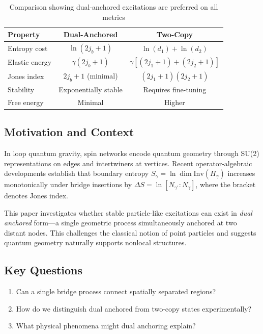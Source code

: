 \documentclass[11pt]{article}
\newcommand{\Inv}{\mathrm{Inv}}
\theoremstyle{plain}
\theoremstyle{definition}
\begin{document}
\begin{table}[h]
  \centering
  \begin{tabular}{lcc}
    \hline
    \textbf{Property} & \textbf{Dual-Anchored} & \textbf{Two-Copy} \\
    \hline
    Entropy cost & $\ln(2j_b+1)$ & $\ln(d_1) + \ln(d_2)$ \\
    Elastic energy & $\gamma (2j_b+1)$ & $\gamma[(2j_1+1) + (2j_2+1)]$ \\
    Jones index & $2j_b+1$ (minimal) & $(2j_1+1)(2j_2+1)$ \\
    Stability & Exponentially stable & Requires fine-tuning \\
    Free energy & Minimal & Higher \\
    \hline
  \end{tabular}
  \caption{Comparison showing dual-anchored excitations are preferred on all metrics}
\end{table}

\subsection{Motivation and Context}
In loop quantum gravity, spin networks encode quantum geometry through SU(2) representations on edges and intertwiners at vertices. Recent operator-algebraic developments \cite{bridge-monotonicity,operator-theory} establish that boundary entropy $S_\gamma = \ln\dim\Inv(H_\gamma)$ increases monotonically under bridge insertions by $\Delta S = \ln[N_{\gamma'}:N_\gamma]$, where the bracket denotes Jones index.

This paper investigates whether stable particle-like excitations can exist in \emph{dual anchored} form—a single geometric process simultaneously anchored at two distant nodes. This challenges the classical notion of point particles and suggests quantum geometry naturally supports nonlocal structures.

\subsection{Key Questions}
\begin{enumerate}
  \item Can a single bridge process connect spatially separated regions?
  \item How do we distinguish dual anchored from two-copy states experimentally?
  \item What physical phenomena might dual anchoring explain?
\end{enumerate}
\end{document}
